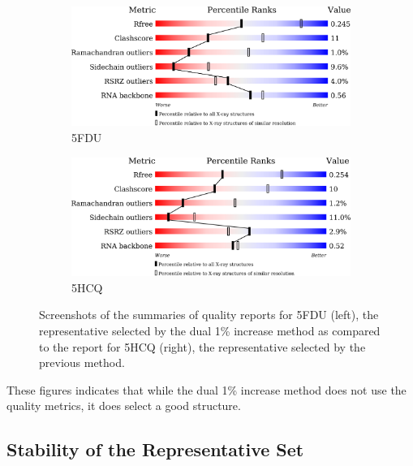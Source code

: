 \begin{figure}
  \begin{subfigure}[b]{0.5\textwidth}
    \includegraphics[width=\linewidth]{chapter-4/figs/quality-reports/5FDU}
    \caption{5FDU}
\label{fig:5FDU-quality}
  \end{subfigure}
  \begin{subfigure}[b]{0.5\textwidth}
    \includegraphics[width=\linewidth]{chapter-4/figs/quality-reports/5HCQ}
    \caption{5HCQ}
\label{fig:5HCQ-quality}
  \end{subfigure}
  \caption{Screenshots of the summaries of quality reports for 5FDU (left), the
          representative selected by the dual 1\% increase method as compared to
          the report for 5HCQ (right), the representative selected by the previous
          method.}
\label{fig:tt-lsu-report}
\end{figure}

These figures indicates that while the dual 1\% increase method does not use the
quality metrics, it does select a good structure.

\subsection{Stability of the Representative Set}

